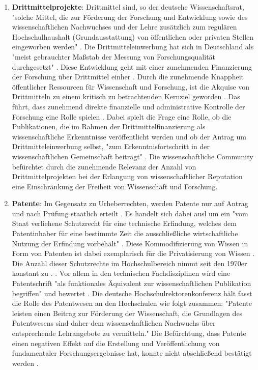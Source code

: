 \begin{enumerate}
\item \textbf{Drittmittelprojekte}: Drittmittel sind, so der deutsche Wissenschaftsrat, "solche Mittel, die zur Förderung der Forschung und Entwicklung sowie des wissenschaftlichen Nachwuchses und der Lehre zusätzlich zum regulären Hochschulhaushalt (Grundausstattung) von öffentlichen oder privaten Stellen eingeworben werden" \cite{wr_2014}. Die Drittmitteleinwerbung hat sich in Deutschland als "meist gebrauchter Maßstab der Messung von Forschungsqualität durchgesetzt" \cite{M_nch_2006}. Diese Entwicklung geht mit einer zunehmenden Finanzierung der Forschung über Drittmittel einher \cite{Neidhardt_2010} \cite{Jansen_2007} \cite{simon_2009_wissenschaft_governance}. Durch die zunehmende Knappheit öffentlicher Ressourcen für Wissenschaft und Forschung, ist die Akquise von Drittmitteln zu einem kritisch zu betrachtenden Kernziel geworden \cite{Jansen_2007}. Das führt, dass zunehmend direkte finanzielle und administrative Kontrolle der Forschung eine Rolle spielen \cite{Barl_sius_2008}. Dabei spielt die Frage eine Rolle, ob die Publikationen, die im Rahmen der Drittmittelfinanzierung als wissenschaftliche Erkenntnisse veröffentlicht werden und ob der Antrag um Drittmitteleinwerbung selbst, "zum Erkenntnisfortschritt in der wissenschaftlichen Gemeinschaft beiträgt" \cite{M_nch_2006}. Die wissenschaftliche Community befürchtet durch die zunehmende Relevanz der Anzahl von Drittmittelprojekten bei der Erlangung von wissenschaftlicher Reputation eine Einschränkung der Freiheit von Wissenschaft und Forschung.
\item \textbf{Patente}: Im Gegensatz zu Urheberrechten, werden Patente nur auf Antrag und nach Prüfung staatlich erteilt \cite[:152]{troy_2012_wissen}. Es handelt sich dabei ausl um ein "vom Staat verliehene Schutzrecht für eine technische Erfindung, welches dem Patentinhaber für eine bestimmte Zeit die ausschließliche wirtschaftliche Nutzung der Erfindung vorbehält" \cite{greif_2003_patente}. Diese Kommodifizierung von Wissen in Form von Patenten ist dabei exemplarisch für die Privatisierung von Wissen \cite[:152]{troy_2012_wissen}. Die Anzahl dieser Schutzrechte im Hochschulbereich nimmt seit den 1970er konstant zu \cite[:168]{troy_2012_wissen}. \cite{schmoch_2003_hochschulforschung} \cite{Fabrizio_2008}. Vor allem in den technischen Fachdisziplinen wird eine Patentschrift "als funktionales Äquivalent zur wissenschaftlichen Publikation begriffen" und bewertet \cite{mersch_2014_patente}. Die deutsche Hochschulrektorenkonferenz hält fasst die Rolle des Patentwesen an den Hochschulen wie folgt zusammen: "Patente leisten einen Beitrag zur Förderung der Wissenschaft, die Grundlagen des Patentwesens sind daher dem wissenschaftlichen Nachwuchs über entsprechende Lehrangebote zu vermitteln." \cite{suchen-Position-HRK} Die Befürchtung, dass Patente einen negativen Effekt auf die Erstellung und Veröffentlichung von fundamentaler Forschungsergebnisse hat, konnte nicht abschließend bestätigt werden \cite{Fabrizio_2008}.

\end{enumerate}
